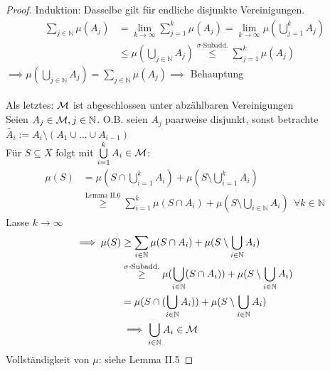 \begin{proof}
    Induktion: Dasselbe gilt für endliche disjunkte Vereinigungen. \begin{align*}
      \sum\limits_{j \in \mathbb{N}} \mu(A_j)
      &= \lim\limits_{k \to \infty} \sum\limits_{j = 1}^k \mu(A_j)
      = \lim\limits_{k \to \infty} \mu(\bigcup\limits_{j=1}^k A_j)\\
      &\leq \mu(\bigcup\limits_{j \in \mathbb{N}} A_j)
      \stackrel{\sigma \text{-Subadd.}}{\leq} \sum\limits_{j=1}^k \mu(A_j)
    \end{align*}
    $\implies \mu(\bigcup\limits_{j \in \mathbb{N}} A_j) = \sum\limits_{j \in \mathbb{N}} \mu(A_j) \implies$ Behauptung\\ \\
    Als letztes: $\mathcal{M}$ ist abgeschlossen unter abzählbaren Vereinigungen\\
    Seien $A_j \in \mathcal{M}, j \in \mathbb{N}$. O.B. seien $A_j$ paarweise disjunkt, sonst betrachte \\
    $\tilde{A_i} := A_i \setminus (A_1 \cup ... \cup A_{i-1})$\\
    Für $S \subseteq X$ folgt mit $\bigcup\limits_{i=1}^k A_i \in \mathcal{M}$:
    \begin{align*}
      \mu(S) &= \mu(S \cap \bigcup\limits_{i=1}^k A_i) + \mu(S \setminus \bigcup\limits_{i=1}^k A_i)\\
      &\stackrel{\text{Lemma II.6}}{\geq} \sum\limits_{i=1}^k \mu(S \cap A_i) + \mu(S \setminus \bigcup\limits_{i \in \mathbb{N}} A_i) \ \ \forall k \in \mathbb{N}
    \end{align*}
    Lasse $k \to \infty$\\
    \begin{align*}
      \implies \mu(S) &\geq \sum\limits_{i \in \mathbb{N}} \mu(S \cap A_i) + \mu(S \setminus \bigcup\limits_{i \in \mathbb{N}} A_i)\\
      &\stackrel{\sigma\text{-Subadd.}}{\geq} \mu(\bigcup\limits_{i \in \mathbb{N}} (S \cap A_i)) + \mu(S \setminus \bigcup\limits_{i \in \mathbb{N}} A_i)\\
      &= \mu(S \cap (\bigcup\limits_{i \in \mathbb{N}} A_i)) + \mu(S \setminus \bigcup\limits_{i \in \mathbb{N}} A_i)\\
      &\implies \bigcup\limits_{i \in \mathbb{N}} A_i \in \mathcal{M}
    \end{align*}
    Vollständigkeit von $\mu$: siehe Lemma II.5
  \end{proof}

